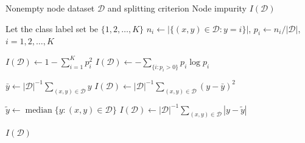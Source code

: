 \begin{algorithm}[H]
	\caption{Node Impurity}
	\label{alg:NodeImpurity}
	\begin{algorithmic}[1]
		\Require Nonempty node dataset $\mathcal{D}$ and splitting criterion
		\Ensure Node impurity $I(\mathcal{D})$
		
		\State Let the class label set be $\{1,2,\dots,K\}$
		\State $n_i\gets|\{(x,y)\in\mathcal{D}:y=i\}|$,
		$p_i\gets n_i/|\mathcal{D}|$, $i=1,2,\dots,K$
		
		\State $I(\mathcal{D})\gets
		1-\sum\limits_{i=1}^Kp_i^2$
		\State $I(\mathcal{D})\gets
		-\sum\limits_{\{i:p_i>0\}}p_i\log p_i$
		\EndIf
		
		\State $\bar{y}\gets
		|\mathcal{D}|^{-1}\sum\limits_{(x,y)\in\mathcal{D}}y$
		\State $I(\mathcal{D})\gets
		|\mathcal{D}|^{-1}\sum\limits_{(x,y)\in\mathcal{D}}(y-\bar{y})^2$
		
		\State $\widetilde{y}\gets
		\operatorname{median}\{y:(x,y)\in\mathcal{D}\}$
		\State $I(\mathcal{D})\gets
		|\mathcal{D}|^{-1}\sum\limits_{(x,y)\in\mathcal{D}}|y-\widetilde{y}|$
		\EndIf
		
		\State \Return $I(\mathcal{D})$
	\end{algorithmic}
\end{algorithm}

